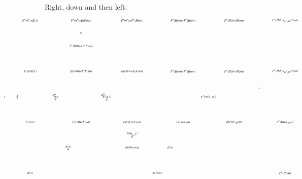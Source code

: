 \documentclass[reqno]{amsart}
\begin{document}
Right, down and then left:
\[
\hspace{-1in}
\begin{tikzpicture}[scale=1.5]
\node (1) at (2,2.5) {$\scriptscriptstyle{\cong}$};
\node (2) at (1,0) {$\scriptscriptstyle{\stackrel{\phi''_{\phi,x}} \cong}$};
\node (3) at (3,0) {$\scriptscriptstyle{\stackrel{\phi''_{F(!_b),1}} \cong}$};
\node (4) at (9,0.33) {$\scriptscriptstyle{\cong}$};
\node (5) at (1.5,-2) {$\scriptscriptstyle{\stackrel{E(\lambda)} \cong}$};
\node (6) at (4,-1.5) {$\scriptscriptstyle{\stackrel{E(\phi_{!_b,1})} \cong}$};
\node (7) at (5.5,-2) {$\scriptscriptstyle{E(\cong)}$};
\node (8) at (-.5,0) {$\scriptscriptstyle{\stackrel{\lambda} \cong}$};
\node (A) at (-1,0) {$\scriptscriptstyle{1}$};

\node (A1) at (0,3) {$\scriptscriptstyle{F'(0') \times E(1)}$};
\node (A2) at (2,3) {$\scriptscriptstyle{F'(0') \times E(F(m))}$};
\node (A3) at (4,3) {$\scriptscriptstyle{F'(0') \times F'(H(m))}$};
\node (A4) at (6,3) {$\scriptscriptstyle{F'(H(b)) \times F'(H(m))}$};
\node (A5) at (8,3) {$\scriptscriptstyle{F'(H(b)+H(m))}$};
\node (A6) at (10,3) {$\scriptscriptstyle{F'(H(b)+_{H(b)} H(m))}$};

\node (A') at (2,2) {$\scriptscriptstyle{F'(H(0)) \times E(F(m))}$};

\node (B1) at (0,1) {$\scriptscriptstyle{E(1) \times E(1)}$};
\node (B2) at (2,1) {$\scriptscriptstyle{E(F(0)) \times E(F(m))}$};
\node (B3) at (4,1) {$\scriptscriptstyle{E(F(b)) \times E(F(m))}$};
\node (B4) at (6,1) {$\scriptscriptstyle{F'(H(b)) \times F'(H(m))}$};
\node (B5) at (8,1) {$\scriptscriptstyle{F'(H(b)+H(m))}$};
\node (B6) at (10,1) {$\scriptscriptstyle{F'(H(b)+_{H(b)}H(m))}$};

\node (B') at (7,0) {$\scriptscriptstyle{F'(H(b+m))}$};

\node (C1) at (0,-1) {$\scriptscriptstyle{E(1 \times 1)}$};
\node (C2) at (2,-1) {$\scriptscriptstyle{E(F(0) \times F(m))}$};
\node (C3) at (4,-1) {$\scriptscriptstyle{E(F(b) \times F(m))}$};
\node (C4) at (6,-1) {$\scriptscriptstyle{E(F(b+m))}$};
\node (C5) at (8,-1) {$\scriptscriptstyle{E(F(b+_b m))}$};
\node (C6) at (10,-1) {$\scriptscriptstyle{F'(H(b+_b m))}$};

\node (D1) at (0,-3) {$\scriptscriptstyle{E(1)}$};
\node (D2) at (5,-3) {$\scriptscriptstyle{E(F(m))}$};
\node (D3) at (10,-3) {$\scriptscriptstyle{F'(H(m))}$};
\node (D') at (4,-2) {$\scriptscriptstyle{E(F(0+m))}$};


\end{tikzpicture}\]
\end{document}
